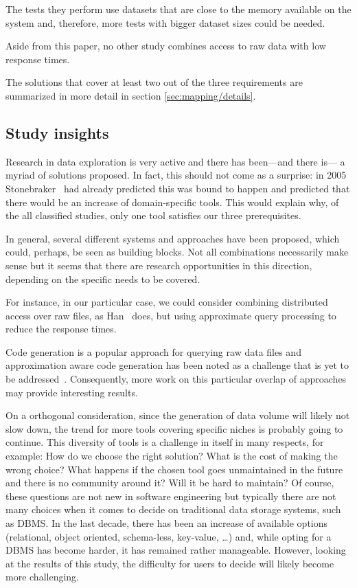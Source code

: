 The tests they perform use datasets that are close
to the memory available on the system and, therefore, more tests with bigger dataset sizes
could be needed.

Aside from this paper, no other study combines access to raw data with low
response times.

The solutions that cover at least two out of the three requirements are 
summarized in more detail in section \ref{sec:mapping/details}.

\subsection{Study insights}
Research in data exploration is very active and there has been---and there is---
a myriad of solutions proposed. In fact, this should not come as a surprise:
in 2005 Stonebraker~\cite{Stonebraker2005} had already predicted this was bound to
happen and predicted that there would be an increase of domain-specific tools.
This would explain why, of the all classified studies, only one tool satisfies our
three prerequisites.

In general, several different systems and approaches have been proposed, which could,
perhaps, be seen as building blocks. Not all combinations necessarily make sense
but it seems that there are research opportunities in this direction, depending
on the specific needs to be covered.

For instance, in our particular case, we could consider combining distributed
access over raw files, as Han~\cite{Han2017} does, but using approximate query
processing to reduce the response times.

Code generation is a popular approach for querying raw data files
and approximation aware code generation has been noted as a challenge
that is yet to be addressed~\cite{Mozafari2017AQP}. Consequently, more work on this
particular overlap of approaches may provide interesting results.

On a orthogonal consideration, since the generation of data volume will likely
not slow down, the trend for more tools covering specific
niches is probably going to continue. This diversity of tools is a
challenge in itself in many respects, for example: How do we choose the right solution? What is
the cost of making the wrong choice? What happens if the chosen tool goes
unmaintained in the future and there is no community around it? Will it
be hard to maintain? Of course, these questions are not new in software
engineering but typically there are not many choices when it comes to decide
on traditional data storage systems, such as DBMS.
In the last decade, there has been an increase of available options
(relational, object oriented, schema-less, key-value, \ldots) and, while opting
for a DBMS has become harder, it has remained rather manageable. However, looking at the
results of this study, the difficulty for users to decide will likely become
more challenging.

